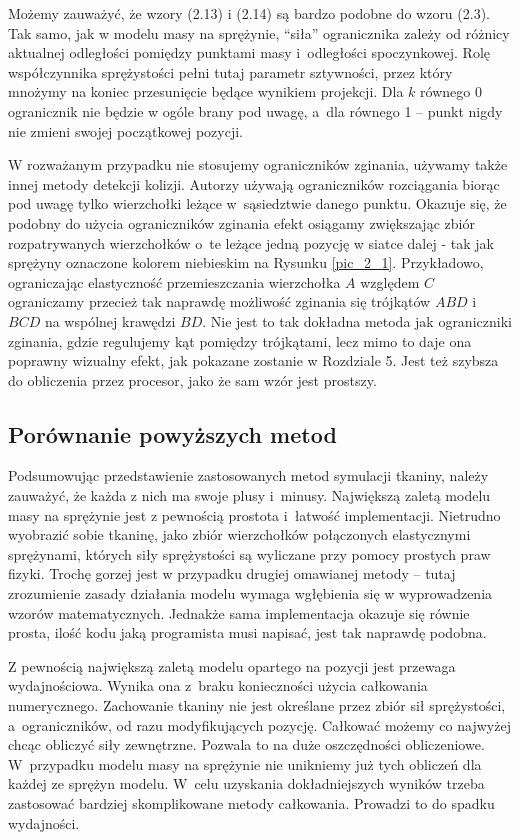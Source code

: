 			Możemy zauważyć, że wzory (2.13) i (2.14) są bardzo podobne do wzoru (2.3). Tak samo, jak w modelu masy na sprężynie, ``siła'' ogranicznika zależy od różnicy aktualnej odległości pomiędzy punktami masy i~odległości spoczynkowej. Rolę współczynnika sprężystości pełni tutaj parametr sztywności, przez który mnożymy na koniec przesunięcie będące wynikiem projekcji. Dla \(k\) równego 0 ogranicznik nie będzie w ogóle brany pod uwagę, a~dla równego 1 -- punkt nigdy nie zmieni swojej początkowej pozycji.
			
			W rozważanym przypadku nie stosujemy ograniczników zginania, używamy także innej metody detekcji kolizji. Autorzy \cite{posbased} używają ograniczników rozciągania biorąc pod uwagę tylko wierzchołki leżące w~sąsiedztwie danego punktu. Okazuje się, że podobny do użycia ograniczników zginania efekt osiągamy zwiększając zbiór rozpatrywanych wierzchołków o~te leżące jedną pozycję w siatce dalej - tak jak sprężyny oznaczone kolorem niebieskim na Rysunku \ref{pic_2_1}. Przykładowo, ograniczając elastyczność przemieszczania wierzchołka \(A\) względem \(C\) ograniczamy przecież tak naprawdę możliwość zginania się trójkątów \(ABD\) i~\(BCD\) na wspólnej krawędzi \(BD\). Nie jest to tak dokładna metoda jak ograniczniki zginania, gdzie regulujemy kąt pomiędzy trójkątami, lecz mimo to daje ona poprawny wizualny efekt, jak pokazane zostanie w Rozdziale 5. Jest też szybsza do obliczenia przez procesor, jako że sam wzór jest prostszy.
		
		\subsection{Porównanie powyższych metod}
		\label{t:teoria:analiza:porownanie}
		
			Podsumowując przedstawienie zastosowanych metod symulacji tkaniny, należy zauważyć, że każda z nich ma swoje plusy i~minusy. Największą zaletą modelu masy na sprężynie jest z pewnością prostota i~łatwość implementacji. Nietrudno wyobrazić sobie tkaninę, jako zbiór wierzchołków połączonych elastycznymi sprężynami, których siły sprężystości są wyliczane przy pomocy prostych praw fizyki. Trochę gorzej jest w przypadku drugiej omawianej metody -- tutaj zrozumienie zasady działania modelu wymaga wgłębienia się w wyprowadzenia wzorów matematycznych. Jednakże sama implementacja okazuje się równie prosta, ilość kodu jaką programista musi napisać, jest tak naprawdę podobna.
			
			Z pewnością największą zaletą modelu opartego na pozycji jest przewaga wydajnościowa. Wynika ona z~braku konieczności użycia całkowania numerycznego. Zachowanie tkaniny nie jest określane przez zbiór sił sprężystości, a~ograniczników, od razu modyfikujących pozycję. Całkować możemy co najwyżej chcąc obliczyć siły zewnętrzne. Pozwala to na duże oszczędności obliczeniowe. W~przypadku modelu masy na sprężynie nie unikniemy już tych obliczeń dla każdej ze sprężyn modelu. W~celu uzyskania dokładniejszych wyników trzeba zastosować bardziej skomplikowane metody całkowania. Prowadzi to do spadku wydajności.
			
